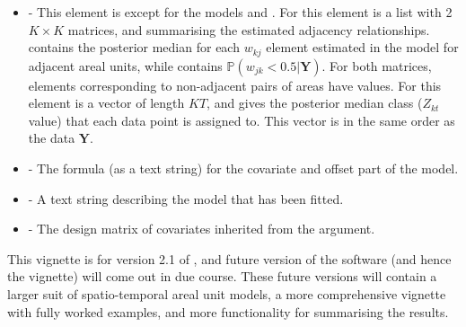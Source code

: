 \documentclass[article,shortnames,nojss]{jss}
\begin{document}
\begin{itemize}
\item {} - This element is  except for the models  and . For  this element is a list with 2 $K \times K$ matrices,  and  summarising the estimated adjacency relationships.  contains the posterior median for each $w_{kj}$ element estimated in the model for adjacent areal units, while  contains $\mathbb{P}(w_{jk} < 0.5|\mathbf{Y})$. For both matrices, elements corresponding to non-adjacent pairs of areas have  values. For  this element is a vector of length $KT$, and gives the posterior median class ($Z_{kt}$ value) that each data point is assigned to. This vector is in the same order as the data $\mathbf{Y}$.
        
\item {} - The formula (as a text string) for the covariate and offset part of the model.

\item {}- A text string describing the model that has been fitted.

\item {} - The design matrix of covariates inherited from the  argument.
\end{itemize}


This vignette is for version 2.1 of , and future version of the software (and hence the vignette) will come out in due course. These future versions will contain a larger suit of spatio-temporal areal unit models, a more comprehensive vignette with fully worked examples, and more functionality for summarising the results. 






\end{document}
